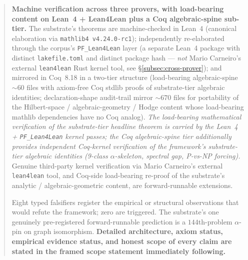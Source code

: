 \documentclass[11pt,a4paper]{amsart}
\theoremstyle{plain}
\theoremstyle{definition}
\begin{document}
\begin{abstract}
\textbf{Machine verification across three provers, with load-bearing content on Lean~4 + Lean4Lean plus a Coq algebraic-spine sub-tier.} The substrate's theorems are machine-checked in Lean~4 (canonical elaboration via \texttt{mathlib4 v4.24.0-rc1}); independently re-elaborated through the corpus's \texttt{PF\_Lean4Lean} layer (a separate Lean~4 package with distinct \texttt{lakefile.toml} and distinct package hash --- \emph{not} Mario Carneiro's external \texttt{lean4lean} Rust kernel tool, see \S\ref{subsec:cross-prover}); and mirrored in Coq~8.18 in a two-tier structure (load-bearing algebraic-spine $\sim 60$ files with axiom-free Coq stdlib proofs of substrate-tier algebraic identities; declaration-shape audit-trail mirror $\sim 670$ files for portability of the Hilbert-space / algebraic-geometry / Hodge content whose load-bearing mathlib dependencies have no Coq analog). \emph{The load-bearing mathematical verification of the substrate-tier headline theorem is carried by the Lean~4 + \texttt{PF\_Lean4Lean} kernel passes; the Coq algebraic-spine tier additionally provides independent Coq-kernel verification of the framework's substrate-tier algebraic identities (9-class $\alpha$-skeleton, spectral gap, P-vs-NP forcing).} Genuine third-party kernel verification via Mario Carneiro's external \texttt{lean4lean} tool, and Coq-side load-bearing re-proof of the substrate's analytic / algebraic-geometric content, are forward-runnable extensions.

Eight typed falsifiers register the empirical or structural observations that would refute the framework; zero are triggered. The substrate's one genuinely pre-registered forward-runnable prediction is a $144$th-problem $\alpha$-pin on graph isomorphism. \textbf{Detailed architecture, axiom status, empirical evidence status, and honest scope of every claim are stated in the framed scope statement immediately following.}
\end{abstract}

\maketitle

\vspace*{-1em}
\end{document}
